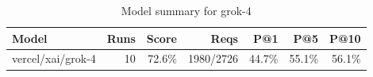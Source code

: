 \begin{table}[htbp]
\centering
\begin{tabular}{lrrrrrr}
\toprule
Model & Runs & Score & Reqs & P@1 & P@5 & P@10 \\
\midrule
vercel/xai/grok-4 & 10 & 72.6\% & 1980/2726 & 44.7\% & 55.1\% & 56.1\% \\
\bottomrule
\end{tabular}
\caption{Model summary for grok-4}
\end{table}
